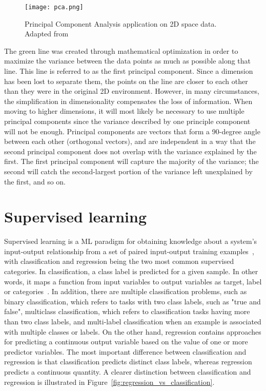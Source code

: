 \begin{figure}[htbp]
    \centering
    \texttt{[image: pca.png]}
    \caption{Principal Component Analysis application on 2D space data. Adapted from~\cite{Patcher2014WhatDNA}}
    \label{fig:pca}
\end{figure}

The green line was created through mathematical optimization in order to maximize the variance between the data points as much as possible along that line. This line is referred to as the first principal component. Since a dimension has been lost to separate them, the points on the line are closer to each other than they were in the original 2D environment. However, in many circumstances, the simplification in dimensionality compensates the loss of information. When moving to higher dimensions, it will most likely be necessary to use multiple principal components since the variance described by one principle component will not be enough. Principal components are vectors that form a 90-degree angle between each other (orthogonal vectors), and are independent in a way that the second principal component does not overlap with the variance explained by the first. The first principal component will capture the majority of the variance; the second will catch the second-largest portion of the variance left unexplained by the first, and so on.

\section{Supervised learning}

Supervised learning is a \gls{ML} paradigm for obtaining knowledge about a system's input-output relationship from a set of paired input-output training examples~\cite{Liu2012SupervisedLearning}, with classification and regression being the two most common supervised categories. In classification, a class label is predicted for a given sample. In other words, it maps a function from input variables to output variables as target, label or categories~\cite{Sarker2021MachineDirections}.
In addition, there are multiple classification problems, such as binary classification, which refers to tasks with two class labels, such as "true and false", multiclass classification, which refers to classification tasks having more than two class labels, and multi-label classification when an example is associated with multiple classes or labels. On the other hand, regression contains approaches for predicting a continuous output variable based on the value of one or more predictor variables. The most important difference between classification and regression is that classification predicts distinct class labels, whereas regression predicts a continuous quantity. A clearer distinction between classification and regression is illustrated in Figure~\ref{fig:regression_vs_classification}.
    
